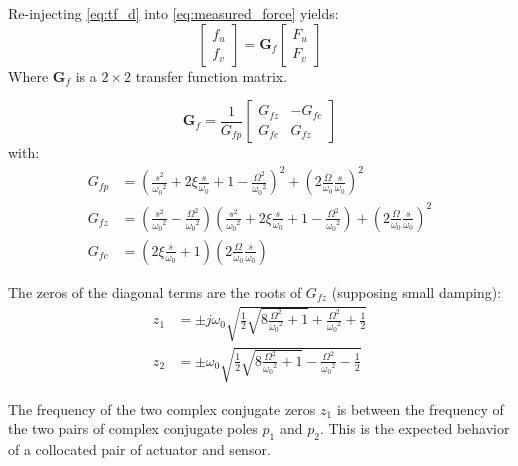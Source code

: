 \documentclass{ISMA_USD2020}
\begin{document}
Re-injecting \eqref{eq:tf_d} into \eqref{eq:measured_force} yields:
\begin{equation}
\label{eq:tf_f}
\begin{bmatrix} f_{u} \\ f_{v} \end{bmatrix} = \bm{G}_{f} \begin{bmatrix} F_u \\ F_v \end{bmatrix}
\end{equation}
Where \(\bm{G}_f\) is a \(2 \times 2\) transfer function matrix.

\begin{equation}
\bm{G}_f =
\frac{1}{G_{fp}}
\begin{bmatrix}
  G_{fz} & -G_{fc} \\
  G_{fc} &  G_{fz}
\end{bmatrix}
\end{equation}
with:
\begin{align}
  G_{fp} &= \left( \frac{s^2}{{\omega_0}^2} + 2 \xi \frac{s}{\omega_0} + 1 - \frac{{\Omega}^2}{{\omega_0}^2} \right)^2 + \left( 2 \frac{\Omega}{\omega_0} \frac{s}{\omega_0} \right)^2 \\
  G_{fz} &= \left( \frac{s^2}{{\omega_0}^2} - \frac{\Omega^2}{{\omega_0}^2} \right) \left( \frac{s^2}{{\omega_0}^2} + 2 \xi \frac{s}{\omega_0} + 1 - \frac{{\Omega}^2}{{\omega_0}^2} \right) + \left( 2 \frac{\Omega}{\omega_0} \frac{s}{\omega_0} \right)^2 \\
  G_{fc} &= \left( 2 \xi \frac{s}{\omega_0} + 1 \right) \left( 2 \frac{\Omega}{\omega_0} \frac{s}{\omega_0} \right)
\end{align}

The zeros of the diagonal terms are the roots of \(G_{fz}\) (supposing small damping):
\begin{subequations}
  \begin{align}
    z_1 &= \pm j \omega_0 \sqrt{\frac{1}{2} \sqrt{8 \frac{\Omega^2}{{\omega_0}^2} + 1} + \frac{\Omega^2}{{\omega_0}^2} + \frac{1}{2} } \\
    z_2 &= \pm   \omega_0 \sqrt{\frac{1}{2} \sqrt{8 \frac{\Omega^2}{{\omega_0}^2} + 1} - \frac{\Omega^2}{{\omega_0}^2} - \frac{1}{2} }
  \end{align}
\end{subequations}

The frequency of the two complex conjugate zeros \(z_1\) is between the frequency of the two pairs of complex conjugate poles \(p_1\) and \(p_2\).
This is the expected behavior of a collocated pair of actuator and sensor.
\end{document}
